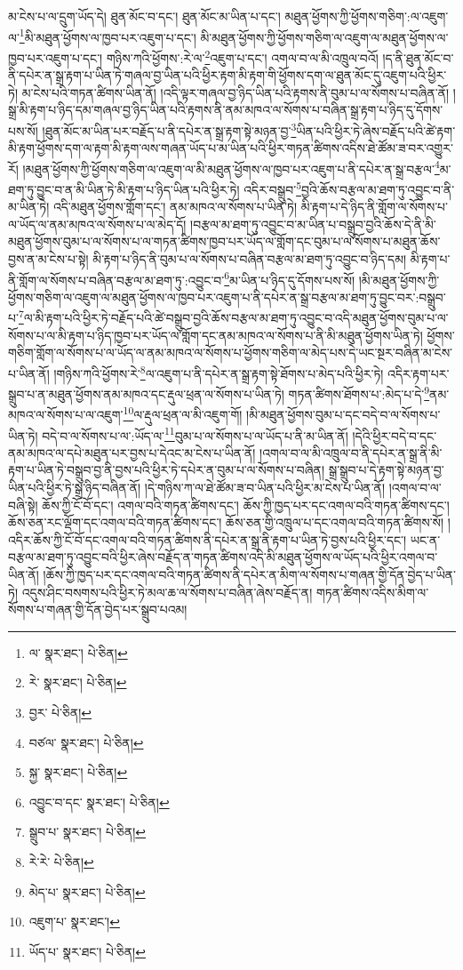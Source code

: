 མ་ངེས་པ་ལ་དྲུག་ཡོད་དེ། ཐུན་མོང་བ་དང་། ཐུན་མོང་མ་ཡིན་པ་དང་། མཐུན་ཕྱོགས་ཀྱི་ཕྱོགས་གཅིག་:ལ་འཇུག་ལ་\footnote{ལ་  སྣར་ཐང་།  པེ་ཅིན། }མི་མཐུན་ཕྱོགས་ལ་ཁྱབ་པར་འཇུག་པ་དང་། མི་མཐུན་ཕྱོགས་ཀྱི་ཕྱོགས་གཅིག་ལ་འཇུག་ལ་མཐུན་ཕྱོགས་ལ་ཁྱབ་པར་འཇུག་པ་དང་། གཉིས་ཀའི་ཕྱོགས་:རེ་ལ་\footnote{རེ་  སྣར་ཐང་།  པེ་ཅིན། }འཇུག་པ་དང་། འགལ་བ་ལ་མི་འཁྲུལ་བའོ། །ད་ནི་ཐུན་མོང་བ་ནི་དཔེར་ན་སྒྲ་རྟག་པ་ཡིན་ཏེ་གཞལ་བྱ་ཡིན་པའི་ཕྱིར་རྟག་མི་རྟག་གི་ཕྱོགས་དག་ལ་ཐུན་མོང་དུ་འཇུག་པའི་ཕྱིར་ཏེ། མ་ངེས་པའི་གཏན་ཚིགས་ཡིན་ནོ། །འདི་ལྟར་གཞལ་བྱ་ཉིད་ཡིན་པའི་རྟགས་ནི་བུམ་པ་ལ་སོགས་པ་བཞིན་ནོ། །སྒྲ་མི་རྟག་པ་ཉིད་དམ་གཞལ་བྱ་ཉིད་ཡིན་པའི་རྟགས་ནི་ནམ་མཁའ་ལ་སོགས་པ་བཞིན་སྒྲ་རྟག་པ་ཉིད་དུ་དོགས་པས་སོ། །ཐུན་མོང་མ་ཡིན་པར་བརྗོད་པ་ནི་དཔེར་ན་སྒྲ་རྟག་སྟེ་མཉན་བྱ་\footnote{བྱར་  པེ་ཅིན། }ཡིན་པའི་ཕྱིར་ཏེ་ཞེས་བརྗོད་པའི་ཚེ་རྟག་མི་རྟག་ཕྱོགས་དག་ལ་རྟག་མི་རྟག་ལས་གཞན་ཡོད་པ་མ་ཡིན་པའི་ཕྱིར་གཏན་ཚིགས་འདིས་ཐེ་ཚོམ་ཟ་བར་འགྱུར་རོ། །མཐུན་ཕྱོགས་ཀྱི་ཕྱོགས་གཅིག་ལ་འཇུག་ལ་མི་མཐུན་ཕྱོགས་ལ་ཁྱབ་པར་འཇུག་པ་ནི་དཔེར་ན་སྒྲ་བརྩལ་\footnote{བཙལ་  སྣར་ཐང་།  པེ་ཅིན། }མ་ཐག་ཏུ་བྱུང་བ་ན་མི་ཡིན་ཏེ་མི་རྟག་པ་ཉིད་ཡིན་པའི་ཕྱིར་ཏེ། འདིར་བསྒྲུབ་\footnote{སྐྱ་  སྣར་ཐང་།  པེ་ཅིན། }བྱའི་ཆོས་བརྩལ་མ་ཐག་ཏུ་འབྱུང་བ་ནི་མ་ཡིན་ཏེ། འདི་མཐུན་ཕྱོགས་གློག་དང་། ནམ་མཁའ་ལ་སོགས་པ་ཡིན་ཏེ། མི་རྟག་པ་དེ་ཉིད་ནི་གློག་ལ་སོགས་པ་ལ་ཡོད་ལ་ནམ་མཁའ་ལ་སོགས་པ་ལ་མེད་དོ། །བརྩལ་མ་ཐག་ཏུ་འབྱུང་བ་མ་ཡིན་པ་བསྒྲུབ་བྱའི་ཆོས་དེ་ནི་མི་མཐུན་ཕྱོགས་བུམ་པ་ལ་སོགས་པ་ལ་གཏན་ཚིགས་ཁྱབ་པར་ཡོད་ལ་གློག་དང་བུམ་པ་ལ་སོགས་པ་མཐུན་ཆོས་བྱས་ན་མ་ངེས་པ་སྟེ། མི་རྟག་པ་ཉིད་ནི་བུམ་པ་ལ་སོགས་པ་བཞིན་བརྩལ་མ་ཐག་ཏུ་འབྱུང་བ་ཉིད་དམ། མི་རྟག་པ་ནི་གློག་ལ་སོགས་པ་བཞིན་བརྩལ་མ་ཐག་ཏུ་:འབྱུང་བ་\footnote{འབྱུང་བ་དང་  སྣར་ཐང་།  པེ་ཅིན། }མ་ཡིན་པ་ཉིད་དུ་དོགས་པས་སོ། །མི་མཐུན་ཕྱོགས་ཀྱི་ཕྱོགས་གཅིག་ལ་འཇུག་ལ་མཐུན་ཕྱོགས་ལ་ཁྱབ་པར་འཇུག་པ་ནི་དཔེར་ན་སྒྲ་བརྩལ་མ་ཐག་ཏུ་བྱུང་བར་:བསྒྲུབ་པ་\footnote{སྒྲུབ་པ་  སྣར་ཐང་།  པེ་ཅིན། }ལ་མི་རྟག་པའི་ཕྱིར་ཏེ་བརྗོད་པའི་ཚེ་བསྒྲུབ་བྱའི་ཆོས་བརྩལ་མ་ཐག་ཏུ་འབྱུང་བ་འདི་མཐུན་ཕྱོགས་བུམ་པ་ལ་སོགས་པ་ལ་མི་རྟག་པ་ཉིད་ཁྱབ་པར་ཡོད་ལ་གློག་དང་ནམ་མཁའ་ལ་སོགས་པ་ནི་མི་མཐུན་ཕྱོགས་ཡིན་ཏེ། ཕྱོགས་གཅིག་གློག་ལ་སོགས་པ་ལ་ཡོད་ལ་ནམ་མཁའ་ལ་སོགས་པ་ཕྱོགས་གཅིག་ལ་མེད་པས་དེ་ཡང་སྔར་བཞིན་མ་ངེས་པ་ཡིན་ནོ། །གཉིས་ཀའི་ཕྱོགས་རེ་\footnote{རེ་རེ་  པེ་ཅིན། }ལ་འཇུག་པ་ནི་དཔེར་ན་སྒྲ་རྟག་སྟེ་ཐོགས་པ་མེད་པའི་ཕྱིར་ཏེ། འདིར་རྟག་པར་སྒྲུབ་པ་ན་མཐུན་ཕྱོགས་ནམ་མཁའ་དང་རྡུལ་ཕྲན་ལ་སོགས་པ་ཡིན་ཏེ། གཏན་ཚིགས་ཐོགས་པ་:མེད་པ་དེ་\footnote{མེད་པ་  སྣར་ཐང་།  པེ་ཅིན། }ནམ་མཁའ་ལ་སོགས་པ་ལ་འཇུག་\footnote{འཇུག་པ་  སྣར་ཐང་། }ལ་རྡུལ་ཕྲན་ལ་མི་འཇུག་གོ། །མི་མཐུན་ཕྱོགས་བུམ་པ་དང་བདེ་བ་ལ་སོགས་པ་ཡིན་ཏེ། བདེ་བ་ལ་སོགས་པ་ལ་:ཡོད་ལ་\footnote{ཡོད་པ་  སྣར་ཐང་།  པེ་ཅིན། }བུམ་པ་ལ་སོགས་པ་ལ་ཡོད་པ་ནི་མ་ཡིན་ནོ། །དེའི་ཕྱིར་བདེ་བ་དང་ནམ་མཁའ་ལ་དཔེ་མཐུན་པར་བྱས་པ་དེའང་མ་ངེས་པ་ཡིན་ནོ། །འགལ་བ་ལ་མི་འཁྲུལ་བ་ནི་དཔེར་ན་སྒྲ་ནི་མི་རྟག་པ་ཡིན་ཏེ་བསྒྲུབ་བྱ་ནི་བྱས་པའི་ཕྱིར་ཏེ་དཔེར་ན་བུམ་པ་ལ་སོགས་པ་བཞིན། སྒྲ་སྒྲུབ་པ་དེ་རྟག་སྟེ་མཉན་བྱ་ཡིན་པའི་ཕྱིར་ཏེ་སྒྲ་ཉིད་བཞིན་ནོ། །དེ་གཉིས་ཀ་ལ་ཐེ་ཚོམ་ཟ་བ་ཡིན་པའི་ཕྱིར་མ་ངེས་པ་ཡིན་ནོ། །འགལ་བ་ལ་བཞི་སྟེ། ཆོས་ཀྱི་ངོ་བོ་དང་། འགལ་བའི་གཏན་ཚིགས་དང་། ཆོས་ཀྱི་ཁྱད་པར་དང་འགལ་བའི་གཏན་ཚིགས་དང་། ཆོས་ཅན་རང་ལྡོག་དང་འགལ་བའི་གཏན་ཚིགས་དང་། ཆོས་ཅན་གྱི་འཁྲུལ་པ་དང་འགལ་བའི་གཏན་ཚིགས་སོ། །འདིར་ཆོས་ཀྱི་ངོ་བོ་དང་འགལ་བའི་གཏན་ཚིགས་ནི་དཔེར་ན་སྒྲ་ནི་རྟག་པ་ཡིན་ཏེ་བྱས་པའི་ཕྱིར་དང་། ཡང་ན་བརྩལ་མ་ཐག་ཏུ་འབྱུང་བའི་ཕྱིར་ཞེས་བརྗོད་ན་གཏན་ཚིགས་འདི་མི་མཐུན་ཕྱོགས་ལ་ཡོད་པའི་ཕྱིར་འགལ་བ་ཡིན་ནོ། །ཆོས་ཀྱི་ཁྱད་པར་དང་འགལ་བའི་གཏན་ཚིགས་ནི་དཔེར་ན་མིག་ལ་སོགས་པ་གཞན་གྱི་དོན་བྱེད་པ་ཡིན་ཏེ། འདུས་ཤིང་བསགས་པའི་ཕྱིར་ཏེ་མལ་ཆ་ལ་སོགས་པ་བཞིན་ཞེས་བརྗོད་ན། གཏན་ཚིགས་འདིས་མིག་ལ་སོགས་པ་གཞན་གྱི་དོན་བྱེད་པར་སྒྲུབ་པའམ། 